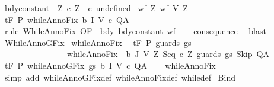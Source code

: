 \begin{isabellebody}
\ bdy{\isacharunderscore}constant{\isacharcolon}\ \ {\isachardoublequoteopen}{\isasymforall}Z{\isachardot}\ c\ Z\ {\isacharequal}\ c\ undefined{\isachardoublequoteclose}\isanewline
{}\ wf{\isacharcolon}\ {\isachardoublequoteopen}{\isasymforall}Z{\isachardot}\ wf\ {\isacharparenleft}V\ Z{\isacharparenright}{\isachardoublequoteclose}\isanewline
{}\ {\isachardoublequoteopen}{\isasymGamma}{\isacharcomma}{\isasymTheta}{\isasymturnstile}\isactrlsub t\isactrlbsub {\isacharslash}F\isactrlesub \ P\ {\isacharparenleft}whileAnnoFix\ b\ I\ V\ c{\isacharparenright}\ Q{\isacharcomma}A{\isachardoublequoteclose}\isanewline
%
\isadelimproof
\ \ %
\endisadelimproof
%
\isatagproof
{}\isamarkupfalse%
\ {\isacharparenleft}rule\ WhileAnnoFix\ {\isacharbrackleft}OF\ {\isacharunderscore}\ bdy\ bdy{\isacharunderscore}constant\ wf{\isacharbrackright}{\isacharparenright}\isanewline
\ \ \isamarkupfalse%
\ consequence\ \isamarkupfalse%
\ blast%
\endisatagproof
{\isafoldproof}%
%
\isadelimproof
\isanewline
%
\endisadelimproof
\isanewline
{}\isamarkupfalse%
\ WhileAnnoGFix{\isacharcolon}\isanewline
{}\ whileAnnoFix{\isacharcolon}\isanewline
\ \ {\isachardoublequoteopen}{\isasymGamma}{\isacharcomma}{\isasymTheta}{\isasymturnstile}\isactrlsub t\isactrlbsub {\isacharslash}F\isactrlesub \ P\ {\isacharparenleft}guards\ gs\ \isanewline
\ \ \ \ \ \ \ \ \ \ \ \ \ \ \ \ {\isacharparenleft}whileAnnoFix\ \ b\ J\ V\ {\isacharparenleft}{\isasymlambda}Z{\isachardot}\ {\isacharparenleft}Seq\ {\isacharparenleft}c\ Z{\isacharparenright}\ {\isacharparenleft}guards\ gs\ Skip{\isacharparenright}{\isacharparenright}{\isacharparenright}{\isacharparenright}{\isacharparenright}\ Q{\isacharcomma}A{\isachardoublequoteclose}\isanewline
{}\ {\isachardoublequoteopen}{\isasymGamma}{\isacharcomma}{\isasymTheta}{\isasymturnstile}\isactrlsub t\isactrlbsub {\isacharslash}F\isactrlesub \ P\ {\isacharparenleft}whileAnnoGFix\ gs\ b\ I\ V\ c{\isacharparenright}\ Q{\isacharcomma}A{\isachardoublequoteclose}\isanewline
%
\isadelimproof
\ \ %
\endisadelimproof
%
\isatagproof
{}\isamarkupfalse%
\ whileAnnoFix\isanewline
\ \ \isamarkupfalse%
\ {\isacharparenleft}simp\ add{\isacharcolon}\ whileAnnoGFix{\isacharunderscore}def\ whileAnnoFix{\isacharunderscore}def\ while{\isacharunderscore}def{\isacharparenright}%
\endisatagproof
{\isafoldproof}%
%
\isadelimproof
\isanewline
%
\endisadelimproof
\isanewline
{}\isamarkupfalse%
\ Bind{\isacharcolon}\isanewline

\end{isabellebody}
